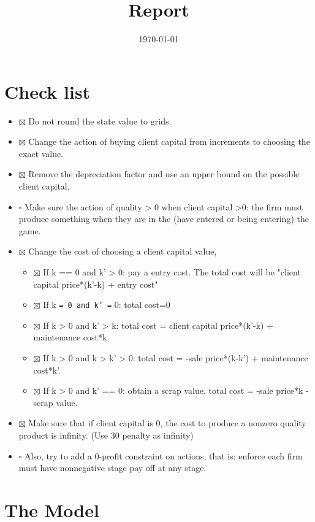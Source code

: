 \documentclass[11pt]{article}
\date{\today}
\title{Report}
\begin{document}
\maketitle
\tableofcontents




\section{Check list}
\label{sec-1}
\begin{itemize}
\item $\boxtimes$ Do not round the state value to grids.
\item $\boxtimes$ Change the action of buying client capital from increments to choosing the exact value.
\item $\boxtimes$ Remove the depreciation factor and use an upper bound on the possible client capital.
\item $\square$ Make sure the action of quality > 0 when client capital >0: the firm must produce 
something when they are in the (have entered or being entering) the game.
\item $\boxtimes$ Change the cost of choosing a client capital value,
\begin{itemize}
\item $\boxtimes$ If k == 0 and k' > 0: pay a entry cost. The total cost will be 
"client capital price*(k'-k) + entry cost"
\item $\boxtimes$ If k \texttt{= 0 and k' =} 0: total cost=0
\item $\boxtimes$ If k > 0 and k' > k: total cost = client capital price*(k'-k) + maintenance cost*k.
\item $\boxtimes$ If k > 0 and k > k' > 0: total cost = -sale price*(k-k') + maintenance cost*k'.
\item $\boxtimes$ If k > 0 and k' == 0: obtain a scrap value. total cost = -sale price*k - scrap value.
\end{itemize}
\item $\boxtimes$ Make sure that if client capital is 0, the cost to produce a nonzero quality product 
is infinity. (Use 30 penalty as infinity)
\item $\square$ Also, try to add a 0-profit constraint on actions, that is: enforce each firm must 
have nonnegative stage pay off at any stage.
\end{itemize}

\section{The Model}
\label{sec-2}
\end{document}
